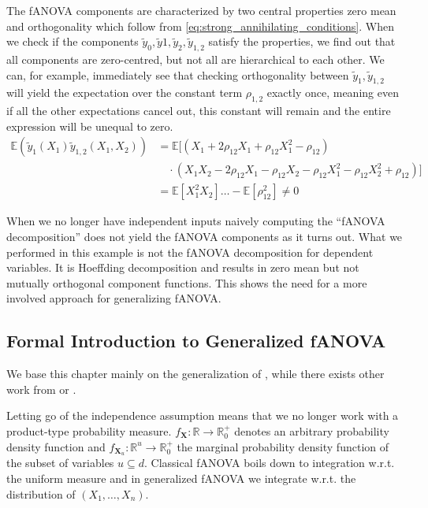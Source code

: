 The fANOVA components are characterized by two central properties zero mean and orthogonality which follow from \autoref{eq:strong_annihilating_conditions}.
When we check if the components $\tilde{y}_0, \tilde{y}1, \tilde{y}_2, \tilde{y}_{1,2}$ satisfy the properties, we find out that all components are zero-centred, but not all are hierarchical to each other. We can, for example, immediately see that checking orthogonality between $\tilde{y}_{1}, \tilde{y}_{1,2}$ will yield the expectation over the constant term $\rho_{1,2}$ exactly once, meaning even if all the other expectations cancel out, this constant will remain and the entire expression will be unequal to zero.
\begin{align*}
    \mathbb{E}(\tilde{y}_1(X_1)\tilde{y}_{1,2}(X_1, X_2)) 
    &= \mathbb{E}[(X_1 + 2\rho_{12}X_1 + \rho_{12}X_1^2 - \rho_{12}) \\
    &\quad \cdot (X_1 X_2 - 2\rho_{12} X_1 - \rho_{12} X_2 - \rho_{12} X_1^2 - \rho_{12} X_2^2 + \rho_{12})] \\
    &= \mathbb{E}[X_{1}^2X_2] \ldots - \mathbb{E}[\rho_{12}^2] \neq 0
\end{align*}

When we no longer have independent inputs naively computing the ``fANOVA decomposition'' does not yield the fANOVA components as it turns out. What we performed in this example is not the fANOVA decomposition for dependent variables. It is Hoeffding decomposition and results in zero mean but not mutually orthogonal component functions. This shows the need for a more involved approach for generalizing fANOVA.

\subsection{Formal Introduction to Generalized fANOVA}
We base this chapter mainly on the generalization of \cite{rahman2014}, while there exists other work from \cite{hooker2007} or \cite{chastaing2012}.\par

Letting go of the independence assumption means that we no longer work with a product-type probability measure. $f_{\boldsymbol{X}}: \mathbb{R} \rightarrow \mathbb{R}_{0}^{+}$ denotes an arbitrary probability density function and $f_{\boldsymbol{X}_u}: \mathbb{R}^u \rightarrow \mathbb{R}_{0}^{+}$ the marginal probability density function of the subset of variables $u \subseteq d$. Classical fANOVA boils down to integration w.r.t. the uniform measure and in generalized fANOVA we integrate w.r.t. the distribution of $(X_1, \dots, X_n)$.\par

